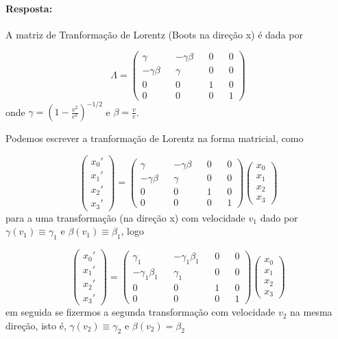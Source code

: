 \documentclass[10pt,a4paper]{article}
\begin{document}
\paragraph{Resposta: }
A matriz de Tranformação de Lorentz (Boots na direção x) é dada por

$$ \Lambda = \left(\begin{matrix}
	\gamma&&-\gamma\beta&&0&&0\\
	-\gamma\beta&&\gamma&&0&&0\\
	0&&0&&1&&0\\
	0&&0&&0&&1
\end{matrix}\right)$$
 onde $\gamma = \left(1 -\frac{v^2}{c^2}\right)^{-1/2}$ e $\beta = \frac{v}{c}$.
 
 Podemos escrever a tranformação de Lorentz na forma matricial, como
 
 \begin{equation}\nonumber
 	\left(\begin{matrix}
 		x_0'\\
 		x_1'\\
 		x_2'\\
 		x_3'
 	\end{matrix}\right) = \left(\begin{matrix}
 	\gamma&&-\gamma\beta&&0&&0\\
 	-\gamma\beta&&\gamma&&0&&0\\
 	0&&0&&1&&0\\
 	0&&0&&0&&1
 \end{matrix}\right)\left(\begin{matrix}
 x_0\\
 x_1\\
 x_2\\
 x_3
\end{matrix}\right)
 \end{equation}
para a uma transformação (na direção x) com velocidade $ v_1 $ dado por $ \gamma(v_1) \equiv \gamma_1 $ e $ \beta(v_1) \equiv \beta_1 $, logo

 \begin{equation}\nonumber
	\left(\begin{matrix}
		x_0'\\
		x_1'\\
		x_2'\\
		x_3'
	\end{matrix}\right) = \left(\begin{matrix}
		\gamma_1&&-\gamma_1\beta_1&&0&&0\\
		-\gamma_1\beta_1&&\gamma_1&&0&&0\\
		0&&0&&1&&0\\
		0&&0&&0&&1
	\end{matrix}\right)\left(\begin{matrix}
		x_0\\
		x_1\\
		x_2\\
		x_3
	\end{matrix}\right)
\end{equation}
 em seguida se fizermos a segunda transformação com velocidade $ v_2 $ na mesma direção, isto é, $\gamma(v_2) \equiv \gamma_2$ e $\beta(v_2) = \beta_2$
 
\end{document}
